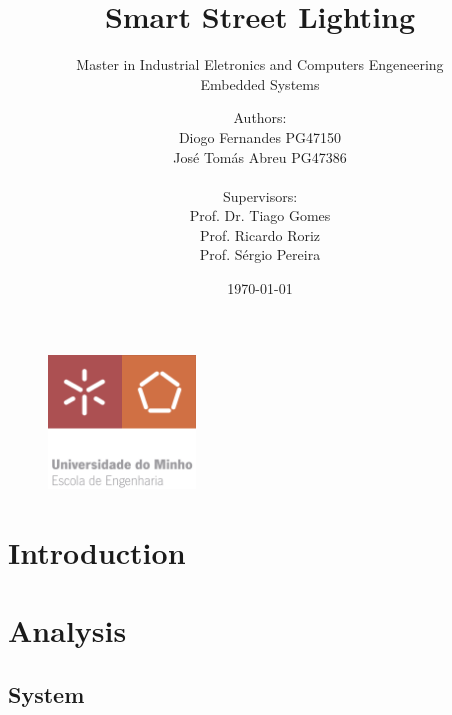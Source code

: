 \documentclass[12pt, letterpaper]{report}
\title{\textbf{Smart Street Lighting}}
\subtitle{{\large Master in Industrial Eletronics and Computers Engeneering} \\ {\large Embedded Systems}}
\author{Authors:\\Diogo Fernandes PG47150\\José Tomás Abreu PG47386\\ \\ Supervisors:\\Prof. Dr. Tiago Gomes\\Prof. Ricardo Roriz\\Prof. Sérgio Pereira}
\date{\today}
\begin{document}
{\begin{figure}[t]
	\centering
	\includegraphics[width=0.35\textwidth]{EEUMLOGO}
\end{figure}}

\maketitle
\clearpage

\tableofcontents
\clearpage

\listoffigures
\clearpage

\listoftables
\clearpage

\chapter{Introduction}


\chapter{Analysis}


\section{System}






\end{document}
